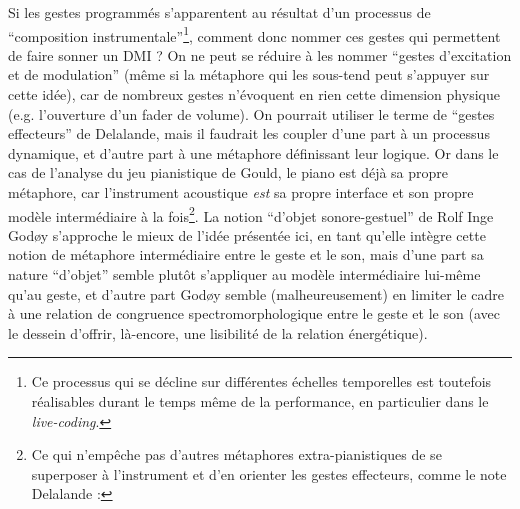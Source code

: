 \noindent Si les gestes programmés s'apparentent au résultat d'un processus de ``composition instrumentale''\footnote{Ce processus qui se décline sur différentes échelles temporelles est toutefois réalisables durant le temps même de la performance, en particulier dans le \textit{live-coding}.}, comment donc nommer ces gestes qui permettent de faire sonner un \gls{DMI} ? On ne peut se réduire à les nommer ``gestes d'excitation et de modulation'' (même si la métaphore qui les sous-tend peut s'appuyer sur cette idée), car de nombreux gestes n'évoquent en rien cette dimension physique (e.g. l'ouverture d'un fader de volume). On pourrait utiliser le terme de ``gestes effecteurs'' de Delalande, mais il faudrait les coupler d'une part à un processus dynamique, et d'autre part à une métaphore définissant leur logique. Or dans le cas de l'analyse du jeu pianistique de Gould, le piano est déjà sa propre métaphore, car l'instrument acoustique \textit{est} sa propre interface et son propre modèle intermédiaire à la fois\footnote{Ce qui n'empêche pas d'autres métaphores extra-pianistiques de se superposer à l'instrument et d'en orienter les gestes effecteurs, comme le note Delalande : }. La notion ``d'objet sonore-gestuel'' de Rolf Inge Godøy s'approche le mieux de l'idée présentée ici, en tant qu'elle intègre cette notion de métaphore intermédiaire entre le geste et le son, mais d'une part sa nature ``d'objet'' semble plutôt s'appliquer au modèle intermédiaire lui-même qu'au geste, et d'autre part Godøy semble (malheureusement) en limiter le cadre à une relation de congruence spectromorphologique entre le geste et le son (avec le dessein d'offrir, là-encore, une lisibilité de la relation énergétique).\\
